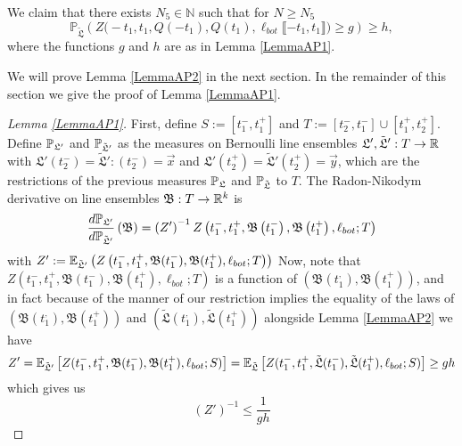 \begin{lemma}\label{LemmaAP2} We claim that there exists $N_5 \in \mathbb{N}$ such that for $N \geq N_5$ 
	\begin{equation}\label{eqn57}
	\mathbb{P}_{\tilde{\mathfrak{L}}} \left( Z\big(  -t_1, t_1, Q(-t_1) ,Q(t_1), \ell_{bot}\llbracket -t_1, t_1\rrbracket\big)\geq g    \right) \geq h,
	\end{equation}
	where the functions $g$ and $h$ are as in Lemma \ref{LemmaAP1}.
\end{lemma}
We will prove Lemma \ref{LemmaAP2} in the next section. In the remainder of this section we give the proof of Lemma \ref{LemmaAP1}.
\begin{proof}[Lemma \ref{LemmaAP1}]
	
	First, define $S:=[t_1^-, t_1^+]$ and $T:=[t_2^-, t_1^-]\cup [t_1^+,t_2^+]$. Define $\mathbb{P}_{\mathfrak L'}$ and $\mathbb{P}_{\tilde{\mathfrak{L}}'}$ as the measures on Bernoulli line ensembles $\mathfrak L', \tilde{\mathfrak{L}}': T\to \mathbb{R}$ with $\mathfrak L'(t_2^-)=\tilde{\mathfrak{L}}':(t_2^-)=\vec x$ and $\mathfrak L'(t_2^+)=\tilde{\mathfrak{L}}'(t_2^+)=\vec y$, which are the restrictions of the previous measures $\mathbb{P}_{\mathfrak L}$ and $\mathbb{P}_{\tilde{\mathfrak{L}}}$ to $T$. The Radon-Nikodym derivative on line ensembles $\mathfrak B: T\to \mathbb{R}^k$ is \begin{equation}\label{propRadon}\frac{d\mathbb{P}_{\mathfrak L'}}{d\mathbb{P}_{\tilde{\mathfrak L}'}}\left(\mathfrak B\right)=\left(Z'\right)^{-1}Z\left(t_1^-,t_1^+,\mathfrak{B}\left(t_1^-\right),\mathfrak{B}\left(t_1^+\right),\ell_{bot};T\right)
	\end{equation}
	with $Z':=\mathbb{E}_{\tilde{\mathfrak{L}}'}\left(Z\left(t_1^-, t_1^+, \mathfrak B(t_1^-), \mathfrak B(t_1^+), \ell_{bot}; T\right)\right)$ Now, note that $Z\left(t_1^-, t_1^+, \mathfrak B(t_1^-), \mathfrak B(t_1^+), \ell_{bot}; T\right)$ is a function of $(\mathfrak B(t_1^,), \mathfrak B(t_1^+))$, and in fact because of the manner of our restriction implies the equality of the laws of $\left(\mathfrak B(t_1^,), \mathfrak B(t_1^+)\right)$ and $(\tilde{\mathfrak L}(t_1^,), \tilde{\mathfrak L}(t_1^+))$ alongside Lemma \ref{LemmaAP2} we have
	\[
	Z'=\mathbb{E}_{\tilde{\mathfrak{L}}'}\left[Z(t_1^-, t_1^+, \mathfrak B(t_1^-),\mathfrak B(t_1^+),\ell_{bot};S)\right]=\mathbb{E}_{\tilde{\mathfrak{L}}}\left[Z(t_1^-, t_1^+, \tilde{\mathfrak L}(t_1^-),\tilde{\mathfrak L}(t_1^+),\ell_{bot};S)\right]\geq gh
	\]
	which gives us 
	\begin{equation}
	\label{Zineq} \left(Z'\right)^{-1}\leq \frac{1}{gh}
	\end{equation}
	

\end{proof}
